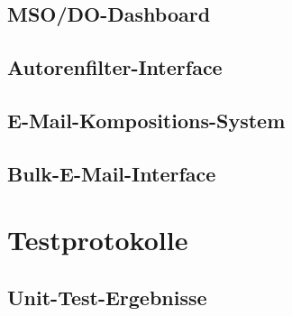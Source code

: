 \documentclass[11pt,a4paper]{article}
\begin{document}
\subsection{MSO/DO-Dashboard}

\subsection{Autorenfilter-Interface}

\subsection{E-Mail-Kompositions-System}

\subsection{Bulk-E-Mail-Interface}

\section{Testprotokolle}

\subsection{Unit-Test-Ergebnisse}
\end{document}
